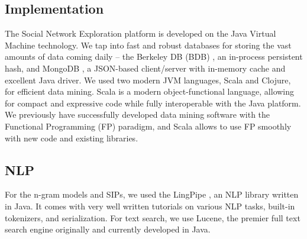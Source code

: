 \subsection{Implementation}

The Social Network Exploration platform is developed on the Java Virtual Machine technology.  We tap into fast and robust databases for storing the vast amounts of data coming daily -- the Berkeley DB (BDB) \cite{BDB}, an in-process persistent hash, and MongoDB \cite{MongoDB}, a JSON-based client/server with in-memory cache and excellent Java driver.  We used two modern JVM languages, Scala and Clojure, for efficient data mining.
Scala is a modern object-functional language, allowing for compact and expressive code while fully interoperable with the Java platform.  We previously have successfully developed data mining software with the Functional Programming (FP) paradigm, and Scala allows to use FP smoothly with new code and existing libraries.


\subsection{NLP}

For the n-gram models and SIPs, we used the LingPipe \cite{LingPipe}, an NLP library written in Java.  It comes with very well written tutorials on various NLP tasks, built-in tokenizers, and serialization.  For text search, we use Lucene, the premier full text search engine originally and currently developed in Java.
